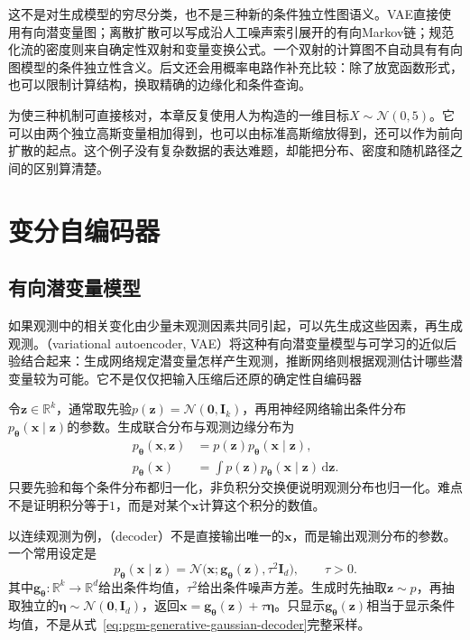 这不是对生成模型的穷尽分类，也不是三种新的条件独立性图语义。VAE直接使用有向潜变量图；离散扩散可以写成沿人工噪声索引展开的有向Markov链；规范化流的密度则来自确定性双射和变量变换公式。一个双射的计算图不自动具有有向图模型的条件独立性含义。后文还会用概率电路作补充比较：除了放宽函数形式，也可以限制计算结构，换取精确的边缘化和条件查询。

为使三种机制可直接核对，本章反复使用人为构造的一维目标$X\sim\mathcal{N}(0,5)$。它可以由两个独立高斯变量相加得到，也可以由标准高斯缩放得到，还可以作为前向扩散的起点。这个例子没有复杂数据的表达难题，却能把分布、密度和随机路径之间的区别算清楚。

\section{变分自编码器}
\label{sec:pgm-generative-vae}

\subsection{有向潜变量模型}
\label{sec:pgm-generative-latent-model}

如果观测中的相关变化由少量未观测因素共同引起，可以先生成这些因素，再生成观测。（variational autoencoder, VAE）将这种有向潜变量模型与可学习的近似后验结合起来：生成网络规定潜变量怎样产生观测，推断网络则根据观测估计哪些潜变量较为可能。它不是仅仅把输入压缩后还原的确定性自编码器

令$\bm{z}\in\mathbb{R}^{k}$，通常取先验$p(\bm{z})=\mathcal{N}(\bm{0},\bm{I}_k)$，再用神经网络输出条件分布$p_{\bm{\theta}}(\bm{x}\mid\bm{z})$的参数。生成联合分布与观测边缘分布为
\begin{equation}
  \label{eq:pgm-generative-vae-joint}
  \begin{aligned}
    p_{\bm{\theta}}(\bm{x},\bm{z})
      &=p(\bm{z})p_{\bm{\theta}}(\bm{x}\mid\bm{z}),\\
    p_{\bm{\theta}}(\bm{x})
      &=\int p(\bm{z})p_{\bm{\theta}}(\bm{x}\mid\bm{z})
          \,\mathrm{d}\bm{z}.
  \end{aligned}
\end{equation}
只要先验和每个条件分布都归一化，非负积分交换便说明观测分布也归一化。难点不是证明积分等于$1$，而是对某个$\bm{x}$计算这个积分的数值。

以连续观测为例，（decoder）不是直接输出唯一的$\bm{x}$，而是输出观测分布的参数。一个常用设定是
\begin{equation}
  \label{eq:pgm-generative-gaussian-decoder}
  p_{\bm{\theta}}(\bm{x}\mid\bm{z})
  =\mathcal{N}\bigl(\bm{x};
    \bm{g}_{\bm{\theta}}(\bm{z}),\tau^2\bm{I}_d\bigr),
  \qquad \tau>0.
\end{equation}
其中$\bm{g}_{\bm{\theta}}:\mathbb{R}^{k}\to\mathbb{R}^{d}$给出条件均值，$\tau^2$给出条件噪声方差。生成时先抽取$\bm{z}\sim p$，再抽取独立的$\bm{\eta}\sim\mathcal{N}(\bm{0},\bm{I}_d)$，返回$\bm{x}=\bm{g}_{\bm{\theta}}(\bm{z})+\tau\bm{\eta}$。只显示$\bm{g}_{\bm{\theta}}(\bm{z})$相当于显示条件均值，不是从式~\eqref{eq:pgm-generative-gaussian-decoder}完整采样。

